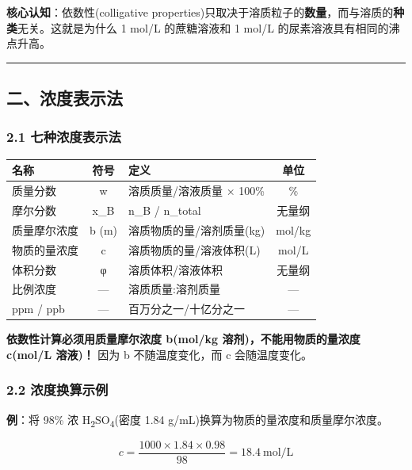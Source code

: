 \textbf{核心认知}：依数性(colligative properties)只取决于溶质粒子的\textbf{数量}，而与溶质的\textbf{种类}无关。这就是为什么 1 mol/L 的蔗糖溶液和 1 mol/L 的尿素溶液具有相同的沸点升高。

\begin{center}\rule{0.5\linewidth}{0.5pt}\end{center}

\subsection{二、浓度表示法}\label{ux4e8cux6d53ux5ea6ux8868ux793aux6cd5}

\subsubsection{2.1 七种浓度表示法}\label{ux4e03ux79cdux6d53ux5ea6ux8868ux793aux6cd5}

{\def\LTcaptype{none} %
\begin{longtable}[]{@{}lclc@{}}
\toprule\noalign{}
名称 & 符号 & 定义 & 单位 \\
\midrule\noalign{}
\endhead
\bottomrule\noalign{}
\endlastfoot
质量分数 & w & 溶质质量/溶液质量 × 100\% & \% \\
摩尔分数 & x\_B & n\_B / n\_total & 无量纲 \\
质量摩尔浓度 & b (m) & 溶质物质的量/溶剂质量(kg) & mol/kg \\
物质的量浓度 & c & 溶质物质的量/溶液体积(L) & mol/L \\
体积分数 & φ & 溶质体积/溶液体积 & 无量纲 \\
比例浓度 & --- & 溶质质量:溶剂质量 & --- \\
ppm / ppb & --- & 百万分之一/十亿分之一 & --- \\
\end{longtable}
}

\textbf{依数性计算必须用质量摩尔浓度 b(mol/kg 溶剂)，不能用物质的量浓度 c(mol/L 溶液)！} 因为 b 不随温度变化，而 c 会随温度变化。

\subsubsection{2.2 浓度换算示例}\label{ux6d53ux5ea6ux6362ux7b97ux793aux4f8b}

\textbf{例}：将 98\% 浓 H\textsubscript{2}SO\textsubscript{4}(密度 1.84 g/mL)换算为物质的量浓度和质量摩尔浓度。

\[
c = \frac{1000 \times 1.84 \times 0.98}{98} = 18.4\ \mathrm{mol/L}
\]

